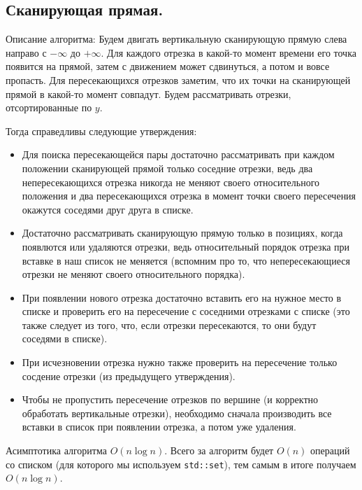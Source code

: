 \subsection{Сканирующая прямая.}
Описание алгоритма:
Будем двигать вертикальную сканирующую прямую слева направо с $-\infty$ до $+\infty$.
Для каждого отрезка в какой-то момент времени его точка появится на прямой, затем с движением может
сдвинуться, а потом и вовсе пропасть. Для пересекающихся отрезков заметим, что их точки на сканирующей
прямой в какой-то момент совпадут. Будем рассматривать отрезки, отсортированные по $y$.

Тогда справедливы следующие утверждения:
\begin{itemize}
  \item Для поиска пересекающейся пары достаточно рассматривать при каждом положении сканирующей прямой
    только соседние отрезки, ведь два непересекающихся отрезка никогда не меняют своего относительного
    положения и два пересекающихся отрезка в момент точки своего пересечения окажутся соседями друг друга
    в списке.
  \item Достаточно рассматривать сканирующую прямую только в позициях, когда появлются или удаляются отрезки,
    ведь относительный порядок отрезка при вставке в наш список не меняется (вспомним про то, что
    непересекающиеся отрезки не меняют своего относительного порядка).
  \item При появлении нового отрезка достаточно вставить его на нужное место в списке и проверить его на
    пересечение с соседними отрезками с списке (это также следует из того, что, если отрезки пересекаются, то
    они будут соседями в списке).
  \item При исчезновении отрезка нужно также проверить на пересечение только сосдение отрезки (из
    предыдущего утверждения).
  \item Чтобы не пропустить пересечение отрезков по вершине (и корректно обработать вертикальные отрезки),
    необходимо сначала производить все вставки в список при появлении отрезка, а потом уже удаления.
\end{itemize}

\begin{remark}
  Асимптотика алгоритма $O(n \log n)$. Всего за алгоритм будет $O(n)$ операций со списком (для которого мы
  используем \texttt{std::set}), тем самым в итоге получаем $O(n \log n)$.
\end{remark}







